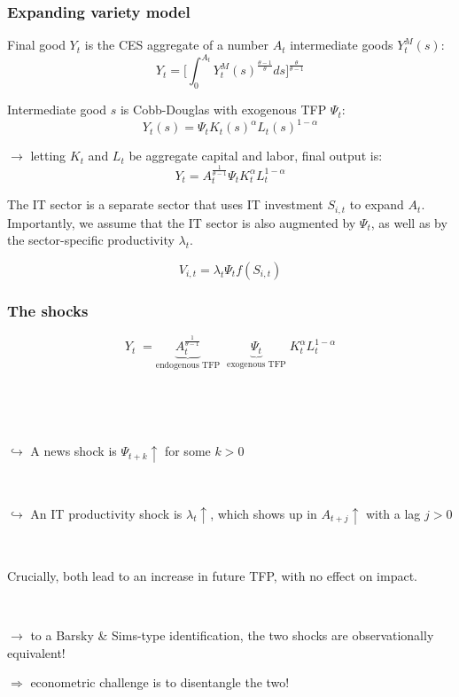 \documentclass{beamer}
\begin{document}
\begin{frame}
	\frametitle{Expanding variety model}
	\label{expanding_variety}
	
Final good $Y_t$ is the CES aggregate of a number $A_t$ intermediate goods $Y_t^M(s)$:	%
	\begin{equation}
	Y_t = \Big[ \int_{0}^{A_t} Y_t^M(s)^{\frac{\theta-1}{\theta} } ds \Big]^{\frac{\theta}{\theta-1}}
	\end{equation}

\pause

Intermediate good $s$ is Cobb-Douglas with exogenous TFP $\Psi_t$:
\begin{equation}
Y_t(s) = \Psi_t K_t(s)^{\alpha}L_t(s)^{1-\alpha}
\end{equation}

\pause

$\rightarrow$ letting $K_t$ and $L_t$ be aggregate capital and labor, final output is:
\begin{equation}
Y_t = A_t^{\frac{1}{\theta-1}} \Psi_t K_t^{\alpha}L_t^{1-\alpha}
\end{equation}


\pause 

The IT sector is a separate sector that uses IT investment $S_{i,t}$ to expand $A_t$. Importantly, we assume that the IT sector is also augmented by $\Psi_t$, as well as by the sector-specific productivity $\lambda_t$. 

\begin{equation}
V_{i,t} = \lambda_t \Psi_t f(S_{i,t}) 
\end{equation}

\hyperlink{it_sector}{}

\end{frame}

\begin{frame}
	\frametitle{The shocks}

	
\begin{equation*}
Y_t \; = \underbrace{A_t^{\frac{1}{\theta-1}}}_\text{endogenous TFP} \; \; \underbrace{\Psi_t}_\text{exogenous TFP} \; K_t^{\alpha}L_t^{1-\alpha}
\end{equation*}

\

\

$\hookrightarrow$ A news shock is $\Psi_{t+k} \uparrow$ for some $k>0$

\

$\hookrightarrow$ An IT productivity shock is $\lambda_t \uparrow$, which shows up in $A_{t+j} \uparrow$ with a lag $j>0$

\

Crucially, both lead to an increase in future TFP, with no effect on impact. 

\

 $\rightarrow$ to a Barsky \& Sims-type identification, the two shocks are observationally equivalent! 
 
 $\Rightarrow$ econometric challenge is to disentangle the two!

\end{frame}
\end{document}
